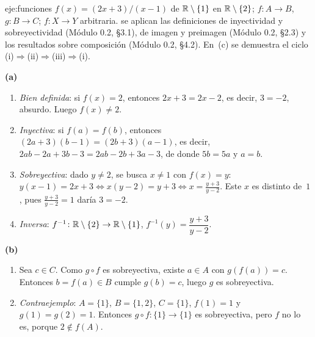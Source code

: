\begin{solucion}{eje:funciones}
\datos $f(x)=(2x+3)/(x-1)$ de $\mathbb{R}\setminus\{1\}$ en $\mathbb{R}\setminus\{2\}$; $f\colon A\to B$, $g\colon B\to C$; $f\colon X\to Y$ arbitraria.
\planteamiento se aplican las definiciones de inyectividad y sobreyectividad (Módulo 0.2, §3.1), de imagen y preimagen (Módulo 0.2, §2.3) y los resultados sobre composición (Módulo 0.2, §4.2). En~(c) se demuestra el ciclo (i)$\Rightarrow$(ii)$\Rightarrow$(iii)$\Rightarrow$(i).
\pasos

\noindent\textbf{(a)}
\begin{enumerate}[label=\arabic*.]
  \item \emph{Bien definida}: si $f(x)=2$, entonces $2x+3=2x-2$, es decir, $3=-2$, absurdo. Luego $f(x)\neq2$.
  \item \emph{Inyectiva}: si $f(a)=f(b)$, entonces $(2a+3)(b-1)=(2b+3)(a-1)$, es decir, $2ab-2a+3b-3=2ab-2b+3a-3$, de donde $5b=5a$ y $a=b$.
  \item \emph{Sobreyectiva}: dado $y\neq2$, se busca $x\neq1$ con $f(x)=y$: $y(x-1)=2x+3\iff x(y-2)=y+3\iff x=\frac{y+3}{y-2}$. Este $x$ es distinto de~$1$, pues $\frac{y+3}{y-2}=1$ daría $3=-2$.
  \item \emph{Inversa}: $f^{-1}\colon\mathbb{R}\setminus\{2\}\to\mathbb{R}\setminus\{1\}$, $f^{-1}(y)=\dfrac{y+3}{y-2}$.
\end{enumerate}

\noindent\textbf{(b)}
\begin{enumerate}[label=\arabic*.]
  \item Sea $c\in C$. Como $g\circ f$ es sobreyectiva, existe $a\in A$ con $g(f(a))=c$. Entonces $b=f(a)\in B$ cumple $g(b)=c$, luego $g$ es sobreyectiva.
  \item \emph{Contraejemplo}: $A=\{1\}$, $B=\{1,2\}$, $C=\{1\}$, $f(1)=1$ y $g(1)=g(2)=1$. Entonces $g\circ f\colon\{1\}\to\{1\}$ es sobreyectiva, pero $f$ no lo es, porque $2\notin f(A)$.
\end{enumerate}


\end{solucion}
